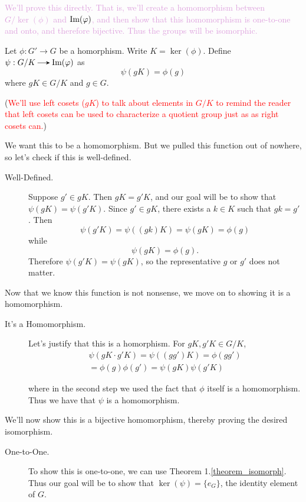     \begin{prf}
        \textcolor{Plum}{We'll prove this directly. That is, we'll create a
        homomorphism between
        $G/\ker(\phi)$ and $\mbox{Im}(\varphi)$, and then show that this
        homomorphism is one-to-one and onto, and therefore bijective.
        Thus the groups will be isomorphic.}

        Let $\phi: G' \to G$ be a homorphism. Write $K = \ker(\phi)$. 
        Define $\psi:
        G/K \to \im(\phi)$ as 
        \[
            \psi(gK) = \phi(g)
        \] 
        where $gK \in G/K$ and $g \in G$. 
        
        (\textcolor{red}{We'll use left cosets ($gK$) to talk about elements
        in $G/K$ to remind the reader that left cosets can be used to
        characterize a quotient group just as
        as right cosets can.})

        \textcolor{NavyBlue}{We want this to be a homomorphism. But we pulled this function
        out of nowhere, so let's check if this is well-defined.}
        \begin{description}
            \item[Well-Defined.]
            Suppose $g' \in gK$. Then $gK = g'K$, and our goal will be to
            show that $\psi(gK) = \psi(g'K)$. Since $g' \in gK$, there
            exists a $k \in K$ such that 
            $gk = g'$. Then  
            \[
                \psi(g'K) = \psi((gk)K) = \psi(gK) = \phi(g)
            \]
            while 
            \[
                \psi(gK) = \phi(g).
            \]
            Therefore $\psi(g'K) = \psi(gK)$, so the representative $g$ or
            $g'$ does not matter.
        \end{description}
        \textcolor{NavyBlue}{Now that we know this function is not nonsense, we move on to
        showing it is a homomorphism.}
        \begin{description}
            \item[It's a Homomorphism.]
            Let's justify that this is a homorphism. For $gK, g'K
            \in G/K$, 
            \begin{align*}
                \psi(gK \cdot g'K) =  \psi((gg')K) = \phi(gg')\\
                 = \phi(g)\phi(g') = \psi(gK)\psi(g'K)
            \end{align*}
    
            where in the second step we used the fact that $\phi$ itself
            is a homomorphism. Thus we have that $\psi$ is a homomorphism. 
        \end{description}
        \textcolor{NavyBlue}{We'll now show this is a bijective homomorphism, thereby
        proving the desired isomorphism.}
        \begin{description}
            \item[One-to-One.] To show this is one-to-one, we can use
            Theorem 1.\ref{theorem_isomorph}. Thus our goal will be to
            show that $\ker(\psi) = \{e_G\}$, the identity element of
            $G$.
            

\end{description}
\end{prf}
